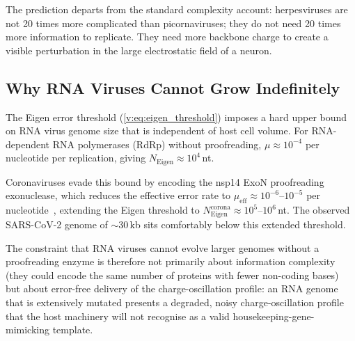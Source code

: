 The prediction departs from the standard complexity account: herpesviruses are not 20 times more complicated than picornaviruses; they do not need 20 times more information to replicate. They need more backbone charge to create a visible perturbation in the large electrostatic field of a neuron.

\subsection{Why RNA Viruses Cannot Grow Indefinitely}

The Eigen error threshold (\cref{v:eq:eigen_threshold}) imposes a hard upper bound on RNA virus genome size that is independent of host cell volume. For RNA-dependent RNA polymerases (RdRp) without proofreading, $\mu \approx 10^{-4}$ per nucleotide per replication, giving $N_{\mathrm{Eigen}} \approx 10^4$\,nt.

Coronaviruses evade this bound by encoding the nsp14 ExoN proofreading exonuclease, which reduces the effective error rate to $\mu_{\mathrm{eff}} \approx 10^{-6}$--$10^{-5}$ per nucleotide~\cite{Denison2011}, extending the Eigen threshold to $N_{\mathrm{Eigen}}^{\mathrm{corona}} \approx 10^5$--$10^6$\,nt. The observed SARS-CoV-2 genome of $\sim\!30$\,kb sits comfortably below this extended threshold.

The constraint that RNA viruses cannot evolve larger genomes without a proofreading enzyme is therefore not primarily about information complexity (they could encode the same number of proteins with fewer non-coding bases) but about error-free delivery of the charge-oscillation profile: an RNA genome that is extensively mutated presents a degraded, noisy charge-oscillation profile that the host machinery will not recognise as a valid housekeeping-gene-mimicking template.

